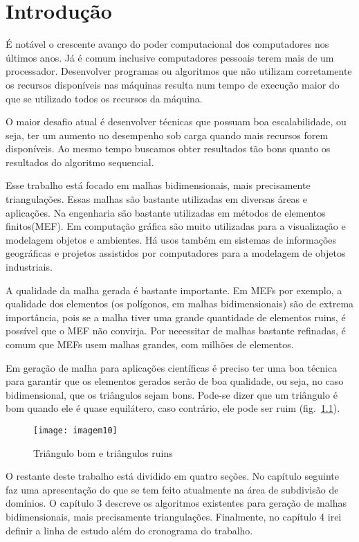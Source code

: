\cleardoublepage
\pagestyle{fancy}

\chapter{Introdução}\label{intro}
É notável o crescente avanço do poder computacional dos computadores nos últimos anos. Já é comum inclusive computadores pessoais terem mais de um processador. Desenvolver programas ou algoritmos que não utilizam corretamente os recursos disponíveis nas máquinas resulta num tempo de execução maior do que se utilizado todos os recursos da máquina.

O maior desafio atual é desenvolver técnicas que possuam boa escalabilidade, ou seja, ter um aumento no desempenho sob carga quando mais recursos forem disponíveis. Ao mesmo tempo buscamos obter resultados tão bons quanto os resultados do algoritmo sequencial.

Esse trabalho está focado em malhas bidimensionais, mais precisamente triangulações. Essas malhas são bastante utilizadas em diversas áreas e aplicações. Na engenharia são bastante utilizadas em métodos de elementos finitos(MEF). Em computação gráfica são muito utilizadas para a visualização e modelagem objetos e ambientes. Há usos também em  sistemas de informações geográficas e projetos assistidos por computadores para a modelagem de objetos industriais.

A qualidade da malha gerada é bastante importante. Em MEFs por exemplo, a qualidade dos elementos (os polígonos, em malhas bidimensionais) são de extrema importância, pois se a malha tiver uma grande quantidade de elementos ruins, é possível que o MEF não convirja. Por necessitar de malhas bastante refinadas, é comum que MEFs usem malhas grandes, com milhões de elementos.

Em geração de malha para aplicações científicas é preciso ter uma boa técnica para garantir que os elementos gerados serão de boa qualidade, ou seja, no caso bidimensional, que os triângulos sejam bons. Pode-se dizer que um triângulo é bom quando ele é quase equilátero, caso contrário, ele pode ser ruim (fig.~\ref{fig:imagem10}).

 \begin{figure}[htbp]
     \centering
     \texttt{[image: imagem10]}
     \caption{Triângulo bom e triângulos ruins} 
     \label{fig:imagem10}
 \end{figure}

O restante deste trabalho está dividido em quatro seções. No capítulo seguinte faz uma apresentação do que se tem feito atualmente na área de subdivisão de domínios. O capítulo 3 descreve os algoritmos existentes para geração de malhas bidimensionais, mais precisamente triangulações. Finalmente, no capítulo 4 irei definir a linha de estudo além do cronograma do trabalho.

